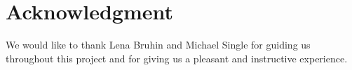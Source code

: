
\section{Acknowledgment}
We would like to thank Lena Bruhin and Michael Single for guiding us throughout this project and for giving us a pleasant and instructive experience.
